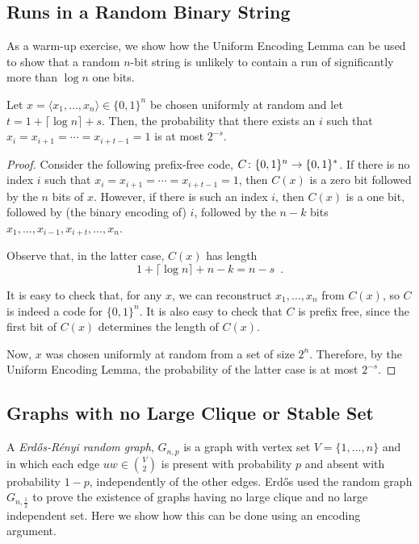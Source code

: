 \documentclass[lotsofwhite]{patmorin}
\begin{document}
\subsection{Runs in a Random Binary String}

As a warm-up exercise, we show how the Uniform Encoding Lemma can be
used to show that a random $n$-bit string is unlikely to contain a run
of significantly more than $\log n$ one bits.

\begin{thm}
  Let $x=\langle x_1,\ldots,x_n\rangle\in\{0,1\}^n$ be chosen uniformly
  at random and let $t=1+\lceil\log n\rceil + s$. Then, the probability
  that there exists an $i$ such that $x_i=x_{i+1}=\cdots=x_{i+t-1}=1$
  is at most $2^{-s}$.
\end{thm}

\begin{proof}
  Consider the following prefix-free code, $C\colon\{0,1\}^n\to\{0,1\}^*$.
  If there is no index $i$ such that $x_i=x_{i+1}=\cdots=x_{i+t-1}=1$,
  then $C(x)$ is a zero bit followed by the $n$ bits of $x$.
  However, if there is such an index $i$, then $C(x)$ is a one bit,
  followed by (the binary encoding of) $i$, followed by the $n-k$ bits
  $x_1,\ldots,x_{i-1},x_{i+t},\ldots,x_n$.

  Observe that, in the latter case, $C(x)$ has length 
  \[
      1 + \lceil\log n\rceil + n - k = n-s \enspace .
  \]

  It is easy to check that, for any $x$, we can reconstruct
  $x_1,\ldots,x_n$ from $C(x)$, so $C$ is indeed a code for $\{0,1\}^n$.
  It is also easy to check that $C$ is prefix free, since the first bit
  of $C(x)$ determines the length of $C(x)$.

  Now, $x$ was chosen uniformly at random from a set of size $2^{n}$.
  Therefore, by the Uniform Encoding Lemma, the probability of the latter
  case is at most $2^{-s}$.
\end{proof}

\subsection{Graphs with no Large Clique or Stable Set}


A \emph{Erd\H{o}s-R\'enyi random graph}, $G_{n,p}$ is a graph with vertex
set $V=\{1,\ldots,n\}$ and in which each edge $uw\in \binom{V}{2}$
is present with probability $p$ and absent with probability $1-p$,
independently of the other edges.  Erd\H{o}s \cite{X} used the random
graph $G_{n,\frac{1}{2}}$ to prove the existence of graphs having no
large clique and no large independent set. Here we show how this can be
done using an encoding argument.
\end{document}

